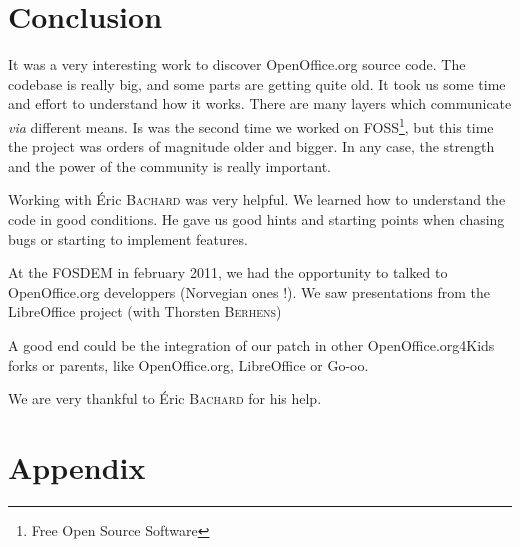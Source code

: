 \documentclass[a4paper,11pt]{article}
\begin{document}
\section*{Conclusion}

It was a very interesting work to discover OpenOffice.org source code.  The
codebase is really big, and some parts are getting quite old. It took us some
time and effort to understand how it works. There are many layers which
communicate \emph{via} different means. Is was the second time we worked on 
FOSS\footnote{Free Open Source Software}, but this time the project was orders
of magnitude older and bigger. In any case, the strength and the power of the
community is really important.

Working with Éric \textsc{Bachard} was very helpful. We learned how to
understand the code in good conditions. He gave us good hints and starting
points when chasing bugs or starting to implement features.

At the FOSDEM in february 2011, we had the opportunity to talked to
OpenOffice.org developpers (Norvegian ones !). We saw presentations from the
LibreOffice project (with Thorsten \textsc{Berhens})

A good end could be the integration of our patch in other OpenOffice.org4Kids
forks or parents, like OpenOffice.org, LibreOffice or Go-oo.

We are very thankful to Éric \textsc{Bachard} for his help.

\newpage
{}
\listoffigures

\newpage
{}
\section*{Appendix}
\end{document}
